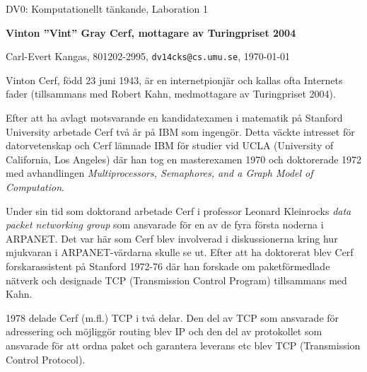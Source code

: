 \documentclass[10pt, titlepage, oneside, a4paper]{article}
\begin{document}
\begin{center}
\begin{large}
DV0: Komputationellt tänkande, Laboration 1

\textbf{Vinton ''Vint'' Gray Cerf, mottagare av Turingpriset 2004}
\end{large}

Carl-Evert Kangas, 801202-2995, \texttt{dv14cks@cs.umu.se}, \today

\end{center}

\thispagestyle{empty}

Vinton Cerf, född 23 juni 1943, är en internetpionjär och kallas ofta Internets fader (tillsammans med Robert Kahn, medmottagare av Turingpriset 2004).

Efter att ha avlagt motsvarande en kandidatexamen i matematik på Stanford University arbetade Cerf två år på IBM som ingengör. Detta väckte intresset för datorvetenskap och Cerf lämnade IBM för studier vid UCLA (University of California, Los Angeles) där han tog en masterexamen 1970 och doktorerade 1972 med avhandlingen \textit{Multiprocessors, Semaphores, and a Graph Model of Computation}.

Under sin tid som doktorand arbetade Cerf i professor Leonard Kleinrocks \textit{data packet networking group} som ansvarade för en av de fyra första noderna i ARPANET. Det var här som Cerf blev involverad i diskussionerna kring hur mjukvaran i ARPANET-värdarna skulle se ut. Efter att ha doktorerat blev Cerf forskarassistent på Stanford 1972-76 där han forskade om paketförmedlade nätverk och designade TCP (Transmission Control Program) tillsammans med Kahn.

1978 delade Cerf (m.fl.) TCP i två delar. Den del av TCP som ansvarade för adressering och möjliggör routing blev IP och den del av protokollet som ansvarade för att ordna paket och garantera leverans etc blev TCP (Transmission Control Protocol).

\vspace{7mm}

\end{document}

